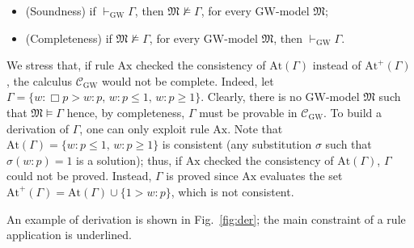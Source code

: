 \documentclass[copyright,creativecommons]{eptcs}
\newcommand{\GWM}{\mbox{$\mathrm{GW}$}}
\newcommand{\Calcw}{\Ccal_{\mathrm{GW}}}
\newcommand{\stru}[1]{\langle #1 \rangle} %
\newcommand{\provesw}[1]{\vdash_{\mathrm{GW}} #1}
\newcommand{\Atm}[1]{\mathrm{At}(#1)}
\newcommand{\Atmp}[1]{\mathrm{At}^{+}\!(#1)}
\newcommand{\M}{\mathfrak{M}}
\newcommand{\ruleAxat}{\mathrm{Ax}\xspace}
\renewcommand{\a}{\alpha}
\newcommand{\s}{\sigma}
\newcommand{\G}{\Gamma}
\newcommand{\Ccal}{\mathcal{C}}
\newcommand{\Ical}{\mathcal{I}}
\begin{document}
\begin{itemize}
\item (Soundness) if $\provesw{\Gamma}$, then $\M\not\models\G$, for
  every \GWM-model $\M$;
\item (Completeness) if $\M\not\models\G$, for every \GWM-model  $\M$, then $\provesw{\Gamma}$.
\end{itemize}
We stress that, if   rule $\ruleAxat$   checked the
consistency of $\Atm{\G}$ instead of  $\Atmp{\G}$, the calculus $\Calcw$ would  not be complete.
Indeed, let  $\G=\{w : \Box p > w:p,\,w:p\leq 1,\,w:p\geq 1\}$.
Clearly, there is no  \GWM-model   $\M$  such that
$\M\models \G$ hence,  by completeness,  $\G$ must  be  provable in $\Calcw$.
To build a derivation of $\G$,  one can only exploit  rule $\ruleAxat$.
Note that $\Atm{\G}=\{w:p\leq 1,\,w:p\geq 1 \}$
is  consistent (any substitution $\s$ such that $\s(w:p)=1$ is a solution);
thus, if $\ruleAxat$  checked the consistency of  $\Atm{\G}$,
   $\G$ could not be proved.
Instead, $\G$ is proved  since $\ruleAxat$   evaluates
the set $\Atmp{\G} =\Atm{\G}\cup \{1 > w:p\}$, which  is not consistent.



An example of derivation is shown in Fig.~\ref{fig:der};
 the main constraint of a rule  application is underlined. 
\end{document}
